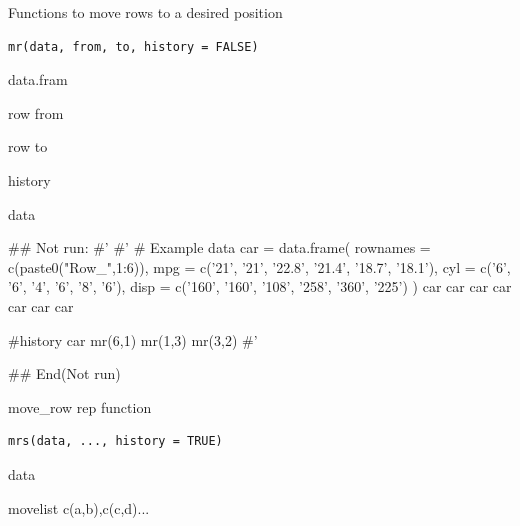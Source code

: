 \documentclass[a4paper]{book}
\begin{document}
%
\begin{Description}
Functions to move rows to a desired position
\end{Description}
%
\begin{Usage}
\begin{verbatim}
mr(data, from, to, history = FALSE)
\end{verbatim}
\end{Usage}
%
\begin{Arguments}
\begin{ldescription}
\item[\code{data}] data.fram

\item[\code{from}] row from

\item[\code{to}] row to

\item[\code{history}] history
\end{ldescription}
\end{Arguments}
%
\begin{Value}
data
\end{Value}
%
\begin{Examples}
\begin{ExampleCode}

## Not run: 
#'
#' # Example data
car = data.frame(
  rownames = c(paste0("Row_",1:6)),
  mpg = c('21', '21', '22.8', '21.4', '18.7', '18.1'),
  cyl = c('6', '6', '4', '6', '8', '6'),
  disp = c('160', '160', '108', '258', '360', '225')
)
car
car %
car %
car %
car %
car %
car %

#history
car %
  mr(6,1)%
  mr(1,3)%
  mr(3,2)
#'

## End(Not run)


\end{ExampleCode}
\end{Examples}
%
\begin{Description}
move\_row rep function
\end{Description}
%
\begin{Usage}
\begin{verbatim}
mrs(data, ..., history = TRUE)
\end{verbatim}
\end{Usage}
%
\begin{Arguments}
\begin{ldescription}
\item[\code{data}] data

\item[\code{...}] movelist c(a,b),c(c,d)...
\end{ldescription}
\end{Arguments}
\end{document}
